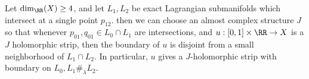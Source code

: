 

Let $\dim_\RR(X)\geq 4$, and let $L_1, L_2$ be exact Lagrangian submanifolds which intersect at a single point $p_{12}$.  then we can choose an almost complex structure $J$ so that whenever $p_{01}, q_{01}\in L_0\cap L_1$ are intersections, and $u: [0,1]\times \RR\to X$ is a $J$ holomorphic strip, then the boundary of $u$ is disjoint from a small neighborhood of $L_1\cap L_2$. In particular, $u$ gives a $J$-holomorphic strip with boundary on $L_0, L_1\#_\lambda L_2$.
